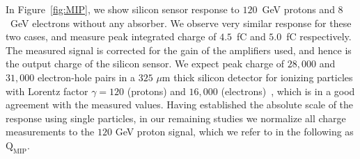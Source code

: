 \documentclass[preprint,1p]{elsarticle}
\begin{document}
In Figure~\ref{fig:MIP}, we show silicon sensor response to $120$~GeV protons
and $8$~GeV electrons without any absorber. We observe very similar response for
these two cases, and measure peak integrated charge of $4.5$~fC and $5.0$~fC
respectively. The measured signal is corrected for the gain of the amplifiers
used, and hence is the output charge of the silicon sensor. We expect peak charge
of $28,000$ and $31,000$ electron-hole pairs in a $325$ $\mu$m thick silicon
detector for ionizing particles with Lorentz factor $\gamma=120$ (protons) and $16,000$
(electrons)~\cite{Agashe:2014kda}, which is in a good agreement with the measured
values. Having established the absolute scale of the response using single
particles, in our remaining studies we normalize all charge measurements to the
$120$ GeV proton signal, which we refer to in the following as
$\mathrm{Q}_{\mathrm{MIP}}$. 


\end{document}
